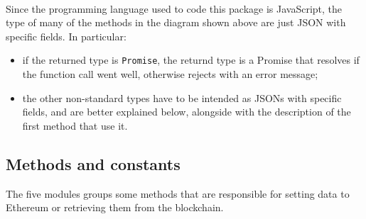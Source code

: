 \\Since the programming language used to code this package is JavaScript, the type of many of the methods in the diagram shown above are just JSON with specific fields. In particular:
\begin{itemize}
	\item if the returned type is \texttt{Promise}, the returnd type is a Promise that resolves if the function call went well, otherwise rejects with an error message;
	\item the other non-standard types have to be intended as JSONs with specific fields, and are better explained below, alongside with the description of the first method that use it.
\end{itemize}
\subsection{Methods and constants}

The five modules groups some methods that are responsible for setting data to Ethereum or retrieving them from the blockchain.

